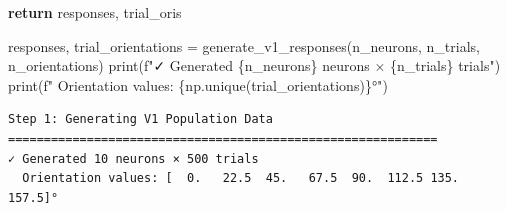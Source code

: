 \documentclass[
  11pt,
  letterpaper,
  oneside,
  openany]{book}
\newenvironment{Shaded}{\begin{snugshade}}{\end{snugshade}}
\newcommand{\BuiltInTok}[1]{\textcolor[rgb]{0.00,0.23,0.31}{#1}}
\newcommand{\ControlFlowTok}[1]{\textcolor[rgb]{0.00,0.23,0.31}{\textbf{#1}}}
\newcommand{\NormalTok}[1]{\textcolor[rgb]{0.00,0.23,0.31}{#1}}
\newcommand{\OperatorTok}[1]{\textcolor[rgb]{0.37,0.37,0.37}{#1}}
\newcommand{\SpecialCharTok}[1]{\textcolor[rgb]{0.37,0.37,0.37}{#1}}
\newcommand{\SpecialStringTok}[1]{\textcolor[rgb]{0.13,0.47,0.30}{#1}}
\begin{document}
\begin{Shaded}
\begin{Highlighting}[]
    \ControlFlowTok{return}\NormalTok{ responses, trial\_oris}

\NormalTok{responses, trial\_orientations }\OperatorTok{=}\NormalTok{ generate\_v1\_responses(n\_neurons, n\_trials, n\_orientations)}
\BuiltInTok{print}\NormalTok{(}\SpecialStringTok{f"✓ Generated }\SpecialCharTok{\{}\NormalTok{n\_neurons}\SpecialCharTok{\}}\SpecialStringTok{ neurons × }\SpecialCharTok{\{}\NormalTok{n\_trials}\SpecialCharTok{\}}\SpecialStringTok{ trials"}\NormalTok{)}
\BuiltInTok{print}\NormalTok{(}\SpecialStringTok{f"  Orientation values: }\SpecialCharTok{\{}\NormalTok{np}\SpecialCharTok{.}\NormalTok{unique(trial\_orientations)}\SpecialCharTok{\}}\SpecialStringTok{°"}\NormalTok{)}
\end{Highlighting}
\end{Shaded}

\begin{verbatim}
Step 1: Generating V1 Population Data
============================================================
✓ Generated 10 neurons × 500 trials
  Orientation values: [  0.   22.5  45.   67.5  90.  112.5 135.  157.5]°
\end{verbatim}
\end{document}
